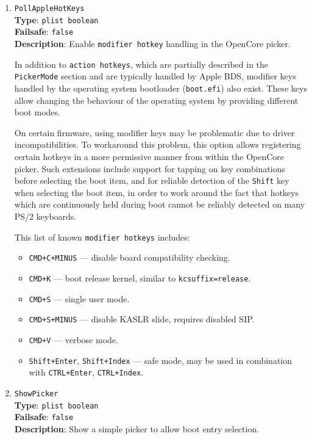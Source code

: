 \documentclass[]{article}
\providecommand{\tightlist}{%
  \setlength{\itemsep}{0pt}\setlength{\parskip}{0pt}}
\begin{document}
\begin{enumerate}
\item
  \texttt{PollAppleHotKeys}\\
  \textbf{Type}: \texttt{plist\ boolean}\\
  \textbf{Failsafe}: \texttt{false}\\
  \textbf{Description}: Enable \texttt{modifier hotkey} handling in the OpenCore picker.

  In addition to \texttt{action hotkeys}, which are partially described in the \texttt{PickerMode}
  section and are typically handled by Apple BDS, modifier keys handled by the operating system
  bootloader (\texttt{boot.efi}) also exist. These keys allow changing the behaviour of the
  operating system by providing different boot modes.

  On certain firmware, using modifier keys may be problematic due to driver incompatibilities.
  To workaround this problem, this option allows registering certain hotkeys in a more permissive
  manner from within the OpenCore picker. Such extensions include support for tapping on key
  combinations before selecting the boot item, and for reliable detection of the \texttt{Shift} key
  when selecting the boot item, in order to work around the fact that hotkeys which are continuously
  held during boot cannot be reliably detected on many PS/2 keyboards.

  This list of known \texttt{modifier hotkeys} includes:
  \begin{itemize}
  \tightlist
  \item \texttt{CMD+C+MINUS} --- disable board compatibility checking.
  \item \texttt{CMD+K} --- boot release kernel, similar to \texttt{kcsuffix=release}.
  \item \texttt{CMD+S} --- single user mode.
  \item \texttt{CMD+S+MINUS} --- disable KASLR slide, requires disabled SIP.
  \item \texttt{CMD+V} --- verbose mode.
  \item \texttt{Shift+Enter}, \texttt{Shift+Index} --- safe mode, may be used in
  combination with \texttt{CTRL+Enter}, \texttt{CTRL+Index}.
  \end{itemize}

\item
  \texttt{ShowPicker}\\
  \textbf{Type}: \texttt{plist\ boolean}\\
  \textbf{Failsafe}: \texttt{false}\\
  \textbf{Description}: Show a simple picker to allow boot entry selection.


\end{enumerate}
\end{document}
